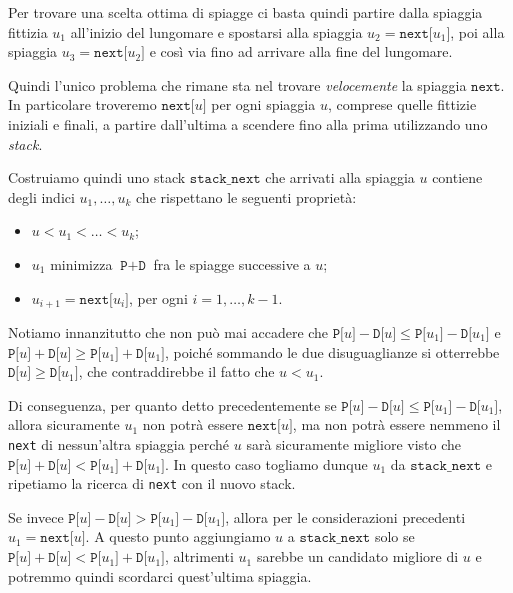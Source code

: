 Per trovare una scelta ottima di spiagge ci basta quindi partire dalla spiaggia fittizia $u_1$ all'inizio del lungomare e spostarsi alla spiaggia $u_2 = \texttt{next[}u_1\texttt{]}$, poi alla spiaggia $u_3 = \texttt{next[}u_2\texttt{]}$ e così via fino ad arrivare alla fine del lungomare.

Quindi l'unico problema che rimane sta nel trovare \emph{velocemente} la spiaggia $\texttt{next}$. In particolare troveremo $\texttt{next[}u\texttt{]}$ per ogni spiaggia $u$, comprese quelle fittizie iniziali e finali, a partire dall'ultima a scendere fino alla prima utilizzando uno \emph{stack}.

Costruiamo quindi uno stack $\texttt{stack\_next}$ che arrivati alla spiaggia $u$ contiene degli indici $u_1,\ldots,u_k$ che rispettano le seguenti proprietà:
\begin{itemize}
 \item $u < u_1 < \ldots < u_k$;
 \item $u_1$ minimizza $\texttt{P}+\texttt{D}$ fra le spiagge successive a $u$;
 \item $u_{i+1} = \texttt{next[}u_i \texttt{]}$, per ogni $i=1,\ldots, k-1$.
\end{itemize}

Notiamo innanzitutto che non può mai accadere che $\texttt{P[}u \texttt{]} - \texttt{D[}u\texttt{]} \le \texttt{P[}u_1 \texttt{]} - \texttt{D[}u_1\texttt{]}$ e $\texttt{P[}u \texttt{]} + \texttt{D[}u\texttt{]} \ge \texttt{P[}u_1 \texttt{]} + \texttt{D[}u_1\texttt{]}$, poiché sommando le due disuguaglianze si otterrebbe $\texttt{D[}u\texttt{]} \ge \texttt{D[}u_1\texttt{]}$, che contraddirebbe il fatto che $u<u_1$.

Di conseguenza, per quanto detto precedentemente se $\texttt{P[}u \texttt{]} - \texttt{D[}u\texttt{]} \le \texttt{P[}u_1 \texttt{]} - \texttt{D[}u_1 \texttt{]}$, allora sicuramente $u_1$ non potrà essere $\texttt{next[}u\texttt{]}$, ma non potrà essere nemmeno il \texttt{next} di nessun'altra spiaggia perché $u$ sarà sicuramente migliore visto che $\texttt{P[}u \texttt{]} + \texttt{D[}u\texttt{]} < \texttt{P[}u_1 \texttt{]} + \texttt{D[}u_1\texttt{]}$.
In questo caso togliamo dunque $u_1$ da $\texttt{stack\_next}$ e ripetiamo la ricerca di \texttt{next} con il nuovo stack.

Se invece $\texttt{P[}u \texttt{]} - \texttt{D[}u\texttt{]} > \texttt{P[}u_1 \texttt{]} - \texttt{D[}u_1 \texttt{]}$, allora per le considerazioni precedenti $u_1 = \texttt{next[}u\texttt{]}$. A questo punto aggiungiamo $u$ a $\texttt{stack\_next}$ solo se $\texttt{P[}u \texttt{]} + \texttt{D[}u\texttt{]} < \texttt{P[}u_1 \texttt{]} + \texttt{D[}u_1 \texttt{]}$, altrimenti $u_1$ sarebbe un candidato migliore di $u$ e potremmo quindi scordarci quest'ultima spiaggia.

